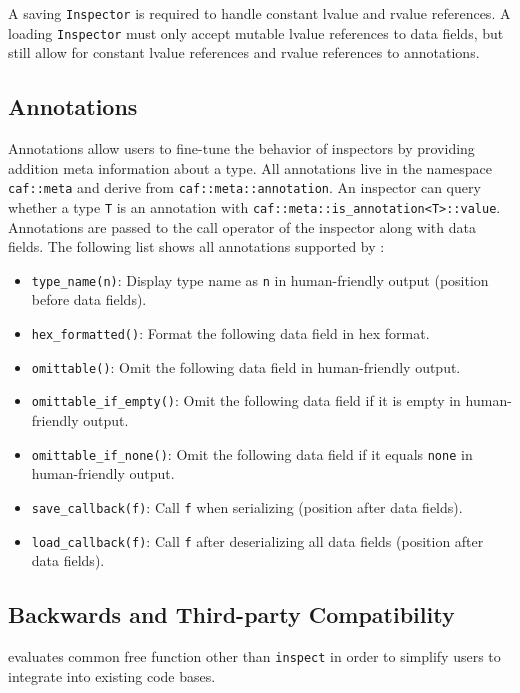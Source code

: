 A saving \lstinline^Inspector^ is required to handle constant lvalue and rvalue
references. A loading \lstinline^Inspector^ must only accept mutable lvalue
references to data fields, but still allow for constant lvalue references and
rvalue references to annotations.

\subsection{Annotations}

Annotations allow users to fine-tune the behavior of inspectors by providing
addition meta information about a type. All annotations live in the namespace
\lstinline^caf::meta^ and derive from \lstinline^caf::meta::annotation^. An
inspector can query whether a type \lstinline^T^ is an annotation with
\lstinline^caf::meta::is_annotation<T>::value^. Annotations are passed to the
call operator of the inspector along with data fields. The following list shows
all annotations supported by \lib:

\begin{itemize}
\item \lstinline^type_name(n)^: Display type name as \lstinline^n^ in
  human-friendly output (position before data fields).
\item \lstinline^hex_formatted()^: Format the following data field in hex
  format.
\item \lstinline^omittable()^: Omit the following data field in human-friendly
  output.
\item \lstinline^omittable_if_empty()^: Omit the following data field if it is
  empty in human-friendly output.
\item \lstinline^omittable_if_none()^: Omit the following data field if it
  equals \lstinline^none^ in human-friendly output.
\item \lstinline^save_callback(f)^: Call \lstinline^f^ when serializing
  (position after data fields).
\item \lstinline^load_callback(f)^: Call \lstinline^f^ after deserializing all
  data fields (position after data fields).
\end{itemize}

\subsection{Backwards and Third-party Compatibility}

\lib evaluates common free function other than \lstinline^inspect^ in order to
simplify users to integrate \lib into existing code bases.

